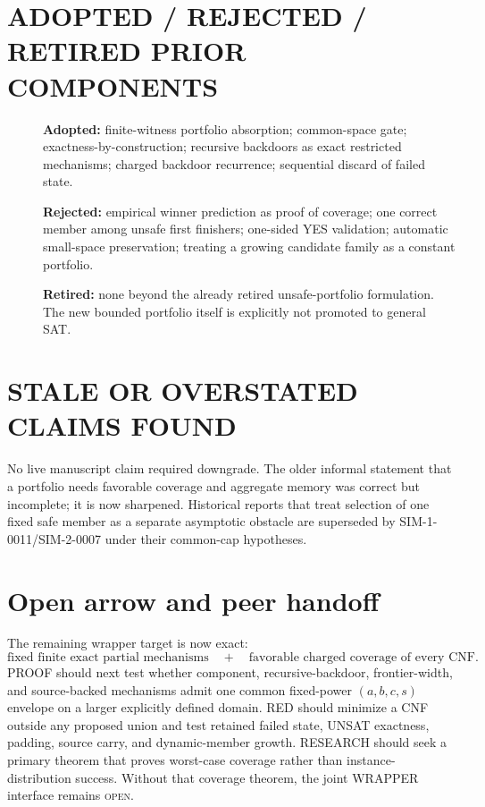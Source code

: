 \documentclass[11pt]{article}
\begin{document}
\section*{ADOPTED / REJECTED / RETIRED PRIOR COMPONENTS}
\begin{description}
\item[] \textbf{Adopted:} finite-witness portfolio absorption; common-space
gate; exactness-by-construction; recursive backdoors as exact restricted
mechanisms; charged backdoor recurrence; sequential discard of failed state.
\item[] \textbf{Rejected:} empirical winner prediction as proof of coverage;
one correct member among unsafe first finishers; one-sided YES validation;
automatic small-space preservation; treating a growing candidate family as a
constant portfolio.
\item[] \textbf{Retired:} none beyond the already retired unsafe-portfolio
formulation.  The new bounded portfolio itself is explicitly not promoted to
general SAT.
\end{description}

\section*{STALE OR OVERSTATED CLAIMS FOUND}
No live manuscript claim required downgrade.  The older informal statement
that a portfolio needs favorable coverage and aggregate memory was correct
but incomplete; it is now sharpened.  Historical reports that treat selection
of one fixed safe member as a separate asymptotic obstacle are superseded by
SIM-1-0011/SIM-2-0007 under their common-cap hypotheses.

\section*{Open arrow and peer handoff}
The remaining wrapper target is now exact:
\[
\boxed{\text{fixed finite exact partial mechanisms}
\quad+\quad\text{favorable charged coverage of every CNF}.}
\]
PROOF should next test whether component, recursive-backdoor, frontier-width,
and source-backed mechanisms admit one common fixed-power $(a,b,c,s)$ envelope
on a larger explicitly defined domain.  RED should minimize a CNF outside any
proposed union and test retained failed state, UNSAT exactness, padding, source
carry, and dynamic-member growth.  RESEARCH should seek a primary theorem that
proves worst-case coverage rather than instance-distribution success.  Without
that coverage theorem, the joint WRAPPER interface remains \textsc{open}.



\end{document}
